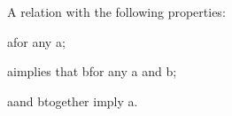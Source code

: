 A relation \R with the following properties:
\par
a\Ra for any a;
\par
a\Rb implies that b\Ra for any a and b;
\par
a\Rb and b\Rc together imply a\Rc.